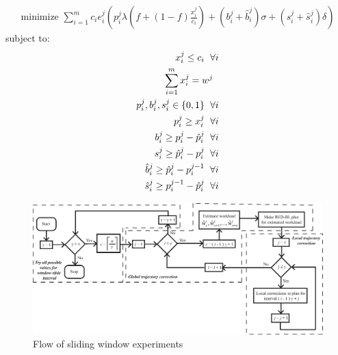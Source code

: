 \begin{align}
\text{minimize } \sum_{i=1}^{m} c_i e_i^j\left(p_i^j \lambda\left(f+\left(1-f\right)\frac{x_i^j}{c_i}\right) + \left(b_i^j+\hat{b}_i^j\right) \sigma + \left(s_i^j+\hat{s}_i^j\right) \delta\right)
\end{align}
subject to:
\begin{align}
x_i^j \le c_i \hspace{6 pt} \forall i \label{eq:lcapcon}\\
\sum_{i = 1}^{m} x_i^j = w^j \hspace{6 pt} \label{eq:lworkcon}\\
p_i^j, b_i^j, s_i^j \in \{0,1\} \hspace{6 pt} \forall i \label{eq:linteger1}\\
p_i^j \ge x_i^j \hspace{6 pt} \forall i \label{eq:lp1}\\
b_i^j \ge p_i^j - \hat{p}_i^j \hspace{6 pt} \forall i \label{eq:lbcon}\\
s_i^j \ge \hat{p}_i^j - p_i^j \hspace{6 pt} \forall i \label{eq:lscon}\\
\hat{b}_i^j \ge \hat{p}_i^j - p_i^{j-1} \hspace{6 pt} \forall i \label{eq:lbcon1} \\
\hat{s}_i^j \ge p_i^{j-1} - \hat{p}_i^j \hspace{6 pt} \forall i \label{eq:lscon1}
\end{align}

\begin{figure}
\includegraphics[width=1\linewidth]{pics/flowchart3.eps}
\caption{Flow of sliding window experiments}
\label{fig:flowchart}
\end{figure}

